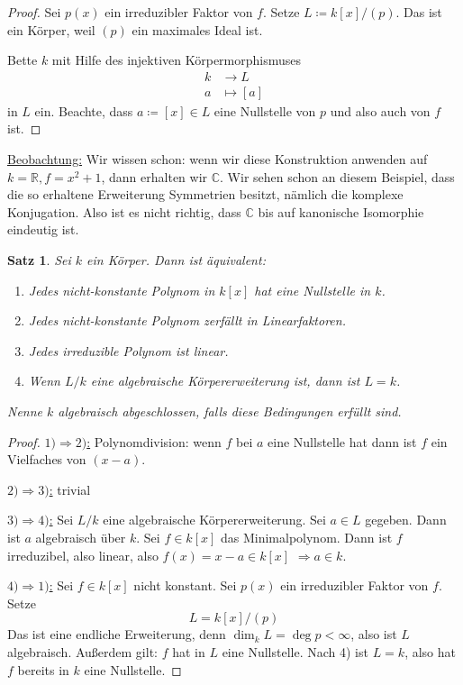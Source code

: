 \documentclass[a4paper,12pt,numbers=noenddot,parskip=full]{scrartcl}
\newcommand{\setR}{\mathbb{R}}
\newcommand{\setC}{\mathbb{C}}
\newcommand{\heading}{\underline}
\theoremstyle{dotless}
\newtheorem{theorem}{Satz}[section]
\theoremstyle{remark}
\begin{document}
	\begin{proof}
		Sei $p(x)$ ein irreduzibler Faktor von $f$. Setze
		$
			L \coloneqq k[x] / (p)
		$.
		Das ist ein Körper, weil $(p)$ ein maximales Ideal ist.
		
		Bette $k$ mit Hilfe des injektiven Körpermorphismuses
		\begin{align*}
			k &\to L \\
			a &\mapsto [a]
		\end{align*}
		in $L$ ein. Beachte, dass $a \coloneqq [x] \in L$ eine Nullstelle von $p$ und also auch von $f$ ist.
	\end{proof}

	\heading{Beobachtung:} Wir wissen schon: wenn wir diese Konstruktion anwenden auf $k = \setR, f = x^2 + 1$, dann erhalten wir $\setC$. Wir sehen schon an diesem Beispiel, dass die so erhaltene Erweiterung Symmetrien besitzt, nämlich die komplexe Konjugation. Also ist es nicht richtig, dass $\setC$ bis auf kanonische Isomorphie eindeutig ist.
	
	\begin{theorem}
		Sei $k$ ein Körper. Dann ist äquivalent:
		\begin{enumerate}
			\item Jedes nicht-konstante Polynom in $k[x]$ hat eine Nullstelle in $k$.
			\item Jedes nicht-konstante Polynom zerfällt in Linearfaktoren.
			\item Jedes irreduzible Polynom ist linear.
			\item Wenn $L/k$ eine algebraische Körpererweiterung ist, dann ist $L = k$.
		\end{enumerate}
		Nenne $k$ algebraisch abgeschlossen, falls diese Bedingungen erfüllt sind.
	\end{theorem}

	\begin{proof}
		\heading{$1) \Rightarrow 2)$:} Polynomdivision: wenn $f$ bei $a$ eine Nullstelle hat dann ist $f$ ein Vielfaches von $(x - a)$.
		
		\heading{$2) \Rightarrow 3)$:} trivial
		
		\heading{$3) \Rightarrow 4)$:} Sei $L/k$ eine algebraische Körpererweiterung. Sei $a \in L$ gegeben. Dann ist $a$ algebraisch über $k$. Sei $f \in k[x]$ das Minimalpolynom. Dann ist $f$ irreduzibel, also linear, also $f(x) = x - a \in k[x]$ $\Rightarrow a \in k$.
		
		\heading{$4) \Rightarrow 1)$:} Sei $f \in k[x]$ nicht konstant. Sei $p(x)$ ein irreduzibler Faktor von $f$. Setze
		\begin{equation*}
			L = k[x]/(p)
		\end{equation*}
		Das ist eine endliche Erweiterung, denn $\dim_k L = \deg p < \infty$, also ist $L$ algebraisch.  Außerdem gilt: $f$ hat in $L$ eine Nullstelle. Nach 4) ist $L = k$, also hat $f$ bereits in $k$ eine Nullstelle.
	\end{proof}
		
\end{document}
